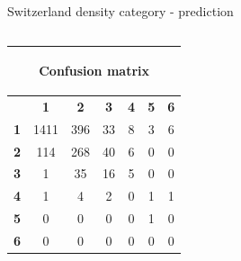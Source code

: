 \documentclass[c]{beamer}
\begin{document}
\begin{frame}
\begin{columns}
\begin{column}{0.5\textwidth}
\begin{overlayarea}{\linewidth}{4cm}
  \end{overlayarea}
  \begin{overlayarea}{\linewidth}{0.5cm}
    \centering
    \tiny Switzerland density category - prediction\par
  \end{overlayarea}
 \end{column}
\end{columns}
\begin{columns}
 \begin{column}{0.6\textwidth}
 \begin{overlayarea}{\linewidth}{2cm}
  \begin{table}
  \begin{center}
  \begin{adjustbox}{max width=0.6\textwidth}
  {\tiny
  \begin{tabular}{|c|c|c|c|c|c|c|}
    \hline
    \multicolumn{7}{|c|}{{\tiny \begin{bf}Confusion matrix\end{bf}}} \\
    \hline
     & \textbf{1} & \textbf{2} & \textbf{3} & \textbf{4} & \textbf{5} & \textbf{6}\\
    \hline
    \textbf{1} & 1411 & 396 & 33 & 8 & 3 & 6\\
    \hline
    \textbf{2} & 114 & 268 & 40 & 6 & 0 & 0\\
    \hline
    \textbf{3} & 1 & 35 & 16 & 5 & 0 & 0\\
    \hline
    \textbf{4} & 1 & 4 & 2 & 0 & 1 & 1\\
    \hline
    \textbf{5} & 0 & 0 & 0 & 0 & 1 & 0\\
    \hline
    \textbf{6} & 0 & 0 & 0 & 0 & 0 & 0\\
    \hline
  \end{tabular}
  }
  \end{adjustbox}
  \end{center}
  \end{table}
 \end{overlayarea}
 \end{column}
 \begin{column}{0.6\textwidth}

\end{column}
\end{columns}
\end{frame}
\end{document}
